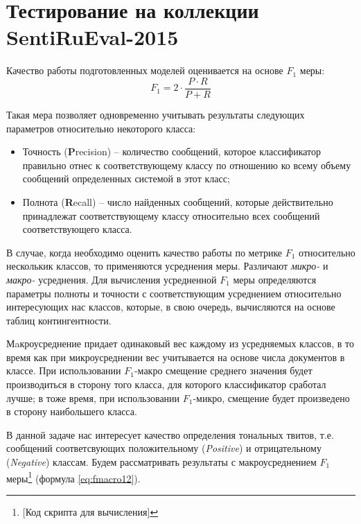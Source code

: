 \section{Тестирование на коллекции SentiRuEval-2015}
\label{sec:sentirueval2015}

Качество работы подготовленных моделей оценивается на основе $F_1$ меры:
\begin{equation}
    \label{eq:fmeasure}
    F_1 = 2 \cdot \dfrac{P \cdot R}{P + R}
\end{equation}

Такая мера позволяет одновременно учитывать результаты следующих параметров
относительно некоторого класса:
\begin{itemize}
    \item Точность ({\bf P}recision) -- количество сообщений, которое
        классификатор правильно отнес к соответствующему классу по отношению ко
        всему объему сообщений определенных системой в этот класс;
    \item Полнота ({\bf R}ecall) -- число найденных сообщений, которые
        действительно принадлежат соответствующему классу относительно всех
        сообщений соответствующего класса.
\end{itemize}

В случае, когда необходимо оценить качество работы по метрике $F_1$ относительно
несколькик классов, то применяются усреднения меры.
Различают {\it микро-} и {\it макро-} усреднения.
Для вычисления усредненной $F_{1}$ меры определяются
параметры полноты и точности с соответствующим усреднением относительно
интересующих нас классов, которые, в свою очередь, вычисляются на основе
таблиц контингентности.

%
%

Мaкроусреднение придает одинаковый вес каждому из усредняемых классов, в то
время как при микроусреднении вес учитывается на основе числа документов в
классе.
При использовании $F_{1}$-макро смещение среднего значения будет производиться в
сторону того класса, для которого классификатор сработал лучше; в тоже время,
при использовании $F_{1}$-микро, смещение будет произведено в сторону наибольшего
класса. \cite{micromacromeasures}

В данной задаче нас интересует качество определения тональных твитов, т.е.
сообщений соответсвующих положительному ({\it Positive}) и отрицательному
({\it Negative}) классам.
Будем рассматривать результаты с макроусреднением $F_1$ меры\footnote{
    [Код скрипта для вычисления]
} (формула \ref{eq:fmacro12}).

